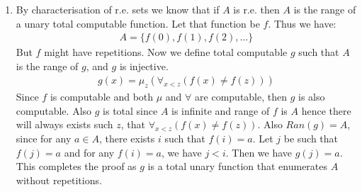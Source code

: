 \begin{enumerate}[label=]
    \item
        By characterisation of r.e. sets we know that if $A$ is r.e. then $A$ is the range of a unary total computable function. Let that function be $f$. Thus we have:
        \begin{gather*}
            A = \{f(0), f(1), f(2), \dots \}
        \end{gather*}
        But $f$ might have repetitions. Now we define total computable $g$ such that $A$ is the range of $g$, and $g$ is injective.
        \begin{gather*}
            g(x) = \mu_z(\forall_{x < z} (f(x) \ne f(z)))
        \end{gather*}
        Since $f$ is computable and both $\mu$ and $\forall$ are computable, then $g$ is also computable. Also $g$ is total since $A$ is infinite and range of $f$ is $A$ hence there will always exists such $z$, that $\forall_{x < z} (f(x) \ne f(z))$. Also $Ran(g) = A$, since for any $a \in A$, there exists $i$ such that $f(i) = a$. Let $j$ be such that $f(j) = a$ and for any $f(i) = a$, we have $j < i$. Then we have $g(j) = a$. This completes the proof as $g$ is a total unary function that enumerates $A$ without repetitions.
\end{enumerate}